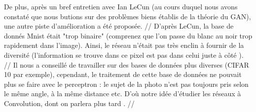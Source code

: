 De plus, après un bref entretien avec Ian LeCun (au cours duquel nous avons constaté que nous butions sur des problèmes biens établis de la théorie du GAN), une autre piste d'amélioration a été proposée. //
D'après LeCun, la base de donnés Mnist était "trop binaire" (comprenez que l'on passe du blanc au noir trop rapidement dans l'image). Ainsi, le réseau n'était pas très enclin à fournir de la diversité (l'information se trouve dans ce pixel est pas dans celui juste à côté ). //
Il nous  a conseillé de travailler sur des bases de données plus diverses (CIFAR 10 par exemple), cependant, le traitement de cette base de données ne pouvait plus se faire avec le perceptron : le sujet de la photo n'est pas toujours pris selon le même angle, à la même distance etc. D'où notre idée d'étudier les réseaux à Convolution, dont on parlera plus tard . //

